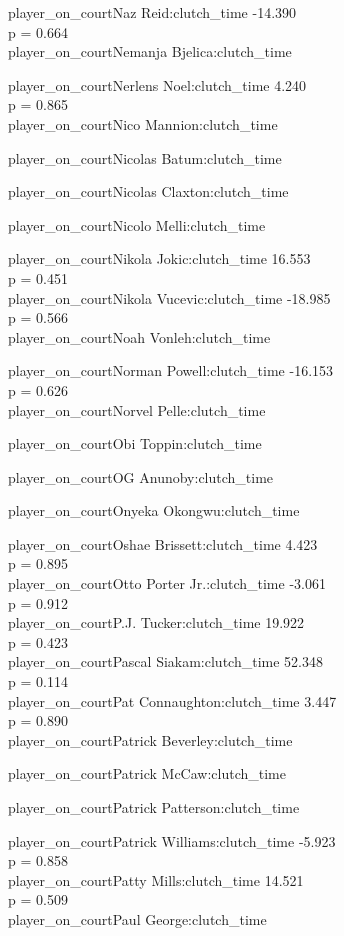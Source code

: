 \documentclass[
  landscape]{article}
\begin{document}
player\_on\_courtNaz Reid:clutch\_time -14.390\\
p = 0.664\\
player\_on\_courtNemanja Bjelica:clutch\_time

player\_on\_courtNerlens Noel:clutch\_time 4.240\\
p = 0.865\\
player\_on\_courtNico Mannion:clutch\_time

player\_on\_courtNicolas Batum:clutch\_time

player\_on\_courtNicolas Claxton:clutch\_time

player\_on\_courtNicolo Melli:clutch\_time

player\_on\_courtNikola Jokic:clutch\_time 16.553\\
p = 0.451\\
player\_on\_courtNikola Vucevic:clutch\_time -18.985\\
p = 0.566\\
player\_on\_courtNoah Vonleh:clutch\_time

player\_on\_courtNorman Powell:clutch\_time -16.153\\
p = 0.626\\
player\_on\_courtNorvel Pelle:clutch\_time

player\_on\_courtObi Toppin:clutch\_time

player\_on\_courtOG Anunoby:clutch\_time

player\_on\_courtOnyeka Okongwu:clutch\_time

player\_on\_courtOshae Brissett:clutch\_time 4.423\\
p = 0.895\\
player\_on\_courtOtto Porter Jr.:clutch\_time -3.061\\
p = 0.912\\
player\_on\_courtP.J. Tucker:clutch\_time 19.922\\
p = 0.423\\
player\_on\_courtPascal Siakam:clutch\_time 52.348\\
p = 0.114\\
player\_on\_courtPat Connaughton:clutch\_time 3.447\\
p = 0.890\\
player\_on\_courtPatrick Beverley:clutch\_time

player\_on\_courtPatrick McCaw:clutch\_time

player\_on\_courtPatrick Patterson:clutch\_time

player\_on\_courtPatrick Williams:clutch\_time -5.923\\
p = 0.858\\
player\_on\_courtPatty Mills:clutch\_time 14.521\\
p = 0.509\\
player\_on\_courtPaul George:clutch\_time
\end{document}
